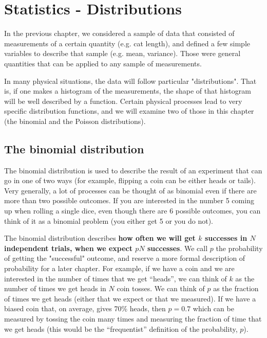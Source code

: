 
%
\chapter{Statistics - Distributions}
\label{chap:StatsDistributions}
In the previous chapter, we considered a sample of data that consisted of measurements of a certain quantity (e.g. cat length), and defined a few simple variables to describe that sample (e.g. mean, variance). Those were general quantities that can be applied to any sample of measurements.

In many physical situations, the data will follow particular "distributions". That is, if one makes a histogram of the measurements, the shape of that histogram will be well described by a function. Certain physical processes lead to very specific distribution functions, and we will examine two of those in this chapter (the binomial and the Poisson distributions).

\section{The binomial distribution}

The binomial distribution is used to describe the result of an experiment that can go in one of two ways (for example, flipping a coin can be either heads or tails). Very generally, a lot of processes can be thought of as binomial even if there are more than two possible outcomes. If you are interested in the number 5 coming up when rolling a single dice, even though there are 6 possible outcomes, you can think of it as a binomial problem (you either get 5 or you do not).

The binomial distribution describes \textbf{how often we will get $k$ successes in $N$ independent trials, when we expect $pN$ successes}. We call $p$ the probability of getting the "successful" outcome, and reserve a more formal description of probability for a later chapter. For example, if we have a coin and we are interested in the number of times that we get ``heads'', we can think of $k$ as the number of times we get heads in $N$ coin tosses. We can think of $p$ as the fraction of times we get heads (either that we expect or that we measured). If we have a biased coin that, on average, gives 70\% heads, then $p=0.7$ which can be measured by tossing the coin many times and measuring the fraction of time that we get heads (this would be the ``frequentist'' definition of the probability, $p$). 


